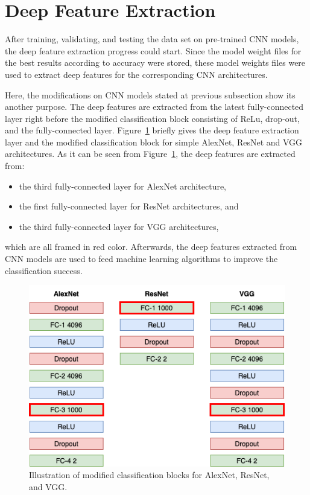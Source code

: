 \section{Deep Feature Extraction}

After training, validating, and testing the data set on pre-trained CNN models, the deep feature extraction progress could start. Since the model weight files for the best results according to accuracy were stored, these model weights files were used to extract deep features for the corresponding CNN architectures.

Here, the modifications on CNN models stated at previous subsection show its another purpose. The deep features are extracted from the latest fully-connected layer right before the modified classification block consisting of ReLu, drop-out, and the fully-connected layer. Figure~\ref{fig:modified_classification_blocks} briefly gives the deep feature extraction layer and the modified classification block for simple AlexNet, ResNet and VGG architectures. As it can be seen from Figure~\ref{fig:modified_classification_blocks}, the deep features are extracted from:

\begin{itemize}
    \item the third fully-connected layer for AlexNet architecture,
    \item the first fully-connected layer for ResNet architectures, and
    \item the third fully-connected layer for VGG architectures,
\end{itemize}

which are all framed in red color. 
Afterwards, the deep features extracted from CNN models are used to feed machine learning algorithms to improve the classification success.

\begin{figure}[h]
    \centering
    \includegraphics[width=.8\linewidth]{fig/modified_classification_blocks.png}
    \vspace{2mm}
    \caption{Illustration of modified classification blocks for AlexNet, ResNet, and VGG.}
    \label{fig:modified_classification_blocks}
\end{figure}

